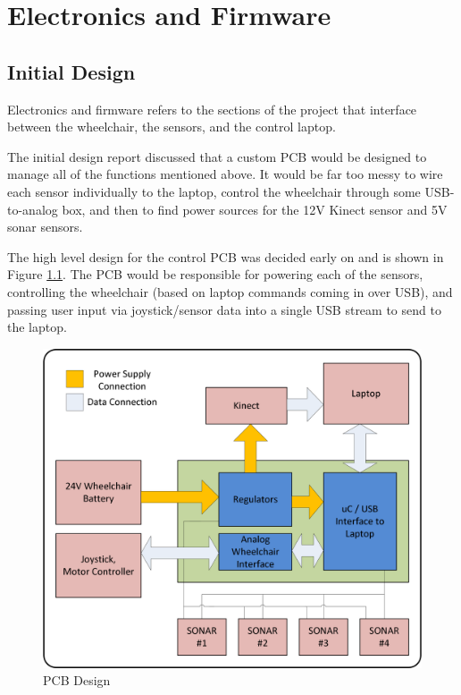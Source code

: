 \documentclass[oneside,final,a4paper]{report}
\begin{document}
\chapter{Electronics and Firmware}

\section{Initial Design}
Electronics and firmware refers to the sections of the project that interface between the wheelchair, the sensors, and the control laptop.

The initial design report discussed that a custom PCB would be designed to manage all of the functions mentioned above. It would be far too messy to wire each sensor individually to the laptop, control the wheelchair through some USB-to-analog box, and then to find power sources for the 12V Kinect sensor and 5V sonar sensors.

The high level design for the control PCB was decided early on and is shown in Figure \ref{fig:hardware_diag}. The PCB would be responsible for powering each of the sensors, controlling the wheelchair (based on laptop commands coming in over USB), and passing user input via joystick/sensor data into a single USB stream to send to the laptop.

\begin{figure}[hbt]
 \centering
 \includegraphics[scale=0.5]{FYDP_PCB_Diagram}
 \caption{PCB Design}\label{fig:hardware_diag}
\end{figure}
\end{document}
